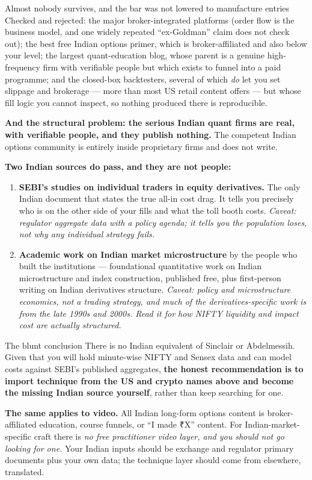 \documentclass[11pt,a4paper]{article}
\newcommand{\rs}{₹}
\begin{document}
\begin{keyfact}{Almost nobody survives, and the bar was not lowered to manufacture entries}
Checked and rejected: the major broker-integrated platforms (order flow is the
business model, and one widely repeated ``ex-Goldman'' claim does not check out);
the best free Indian options primer, which is broker-affiliated and also below your
level; the largest quant-education blog, whose parent is a genuine high-frequency
firm with verifiable people but which exists to funnel into a paid programme; and
the closed-box backtesters, several of which \emph{do} let you set slippage and
brokerage --- more than most US retail content offers --- but whose fill logic you
cannot inspect, so nothing produced there is reproducible.

\textbf{And the structural problem: the serious Indian quant firms are real, with
verifiable people, and they publish nothing.} The competent Indian options
community is entirely inside proprietary firms and does not write.
\end{keyfact}

\textbf{Two Indian sources do pass, and they are not people:}

\begin{enumerate}
\item \textbf{SEBI's studies on individual traders in equity derivatives.} The only
Indian document that states the true all-in cost drag. It tells you precisely who
is on the other side of your fills and what the toll booth costs. \emph{Caveat:
regulator aggregate data with a policy agenda; it tells you the population loses,
not why any individual strategy fails.}
\item \textbf{Academic work on Indian market microstructure} by the people who
built the institutions --- foundational quantitative work on Indian microstructure
and index construction, published free, plus first-person writing on Indian
derivatives structure. \emph{Caveat: policy and microstructure economics, not a
trading strategy, and much of the derivatives-specific work is from the late 1990s
and 2000s. Read it for how NIFTY liquidity and impact cost are actually structured.}
\end{enumerate}

\begin{keyfact}{The blunt conclusion}
There is no Indian equivalent of Sinclair or Abdelmessih. Given that you will hold
minute-wise NIFTY and Sensex data and can model costs against SEBI's published
aggregates, \textbf{the honest recommendation is to import technique from the US
and crypto names above and become the missing Indian source yourself}, rather than
keep searching for one.

\textbf{The same applies to video.} All Indian long-form options content is
broker-affiliated education, course funnels, or ``I made \rs X'' content. For
Indian-market-specific craft there is \emph{no free practitioner video layer, and
you should not go looking for one.} Your Indian inputs should be exchange and
regulator primary documents plus your own data; the technique layer should come
from elsewhere, translated.
\end{keyfact}
\end{document}

